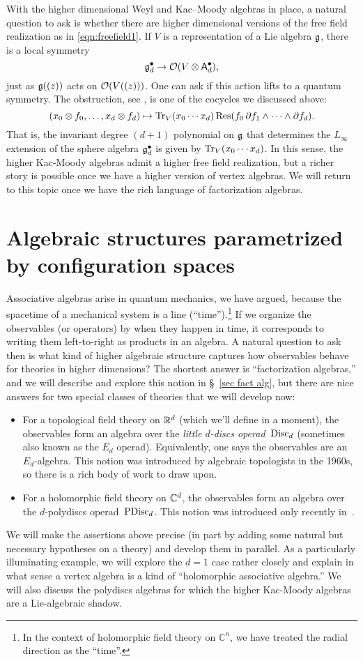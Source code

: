 \documentclass[11pt]{amsart}
\def\C{{\mathbb{C}}}
\begin{document}
With the higher dimensional Weyl and Kac--Moody algebras in place, a natural question to ask is whether there are higher dimensional versions of the free field realization as in \eqref{eqn:freefield1}. 
If $V$ is a representation of a Lie algebra $\mathfrak g$,
there is a local symmetry 
\[
\mathfrak g^\bullet_d \to \mathcal O(V \otimes \mathsf A^{\bullet}_d),
\]
just as $\mathfrak g((z))$ acts on $\mathcal O(V((z)))$. 
One can ask if this action lifts to a quantum symmetry.
The obstruction, see \cite{GWkm}, is one of the cocycles we discussed above:
\[
(x_0 \otimes f_0, \ldots, x_{d} \otimes f_{d}) \mapsto {\rm Tr}_V( x_0 \cdots x_{d}) \,{\rm Res}(f_0 \, \partial f_1 \wedge \cdots \wedge \partial f_{d}).
\]
That is, the invariant degree $(d+1)$ polynomial on $\mathfrak g$ that determines the $L_\infty$ extension of the sphere algebra $\mathfrak g_d^\bullet$ is given by ${\rm Tr}_V (x_0 \cdots x_{d})$.
In this sense, the higher Kac-Moody algebras admit a higher free field realization,
but a richer story is possible once we have a higher version of vertex algebras.
We will return to this topic once we have the rich language of factorization algebras.

\section{Algebraic structures parametrized by configuration spaces}
\label{sec: config}

Associative algebras arise in quantum mechanics, we have argued, because the spacetime of a mechanical system is a line (``time'').\footnote{In the context of holomorphic field theory on $\C^n$, we have treated the radial direction as the ``time''.}
If we organize the observables (or operators) by when they happen in time,
it corresponds to writing them left-to-right as products in an algebra.
A natural question to ask then is what kind of higher algebraic structure captures how observables behave for theories in higher dimensions?
The shortest answer is ``factorization algebras,'' and we will describe and explore this notion in \S~\ref{sec fact alg},
but there are nice answers for two special classes of theories that we will develop now:
\begin{itemize}
\item For a topological field theory on $\mathbb R^d$ (which we'll define in a moment),
the observables form an algebra over the {\em little $d$-discs operad}~${\rm Disc}_d$ (sometimes also known as the $E_d$ operad). 
Equivalently, one says the observables are an $E_d$-algebra. 
This notion was introduced by algebraic topologists in the 1960s, 
so there is a rich body of work to draw upon.
\item For a holomorphic field theory on $\mathbb C^d$,
the observables form an algebra over the $d$-polydiscs operad~${\rm PDisc}_d$.
This notion was introduced only recently in~\cite{CG1}.
\end{itemize}
We will make the assertions above precise (in part by adding some natural but necessary hypotheses on a theory)
and develop them in parallel.
As a particularly illuminating example, we will explore the $d=1$ case rather closely and explain in what sense a vertex algebra is a kind of ``holomorphic associative algebra.''
We will also discuss the polydiscs algebras for which the higher Kac-Moody algebras are a Lie-algebraic shadow.
\end{document}
